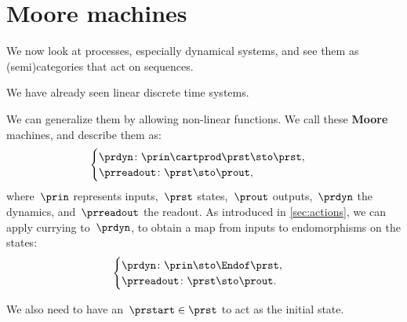 
\section{Moore machines}
\label{sec:moore-machines}

We now look at processes, especially dynamical systems, and see them as (semi)\-categories that act on sequences.

We have already seen linear discrete time systems.

We can generalize them by allowing non-linear functions.
We call these \textbf{Moore} machines, and describe them as:
%
\begin{equation}
    \label{eq:moore-1}
    \begin{cases}
        \prdyn \colon \prin \cartprod \prst \sto \prst, \\
        \prreadout \colon \prst \sto \prout,
    \end{cases}
\end{equation}
%
where~$\prin$ represents inputs,~$\prst$ states,~$\prout$ outputs,~$\prdyn$ the dynamics, and~$\prreadout$ the readout.
As introduced in \cref{sec:actions}, we can apply currying to~$\prdyn$, to obtain a map from inputs to endomorphisms on the states:
%
\begin{equation}
    \label{eq:moore-1-endo}
    \begin{cases}
        \prdyn \colon \prin \sto \Endof \prst, \\
        \prreadout \colon \prst \sto \prout.
    \end{cases}
\end{equation}
%

We also need to have an~$\prstart \in \prst$ to act as the initial state.

